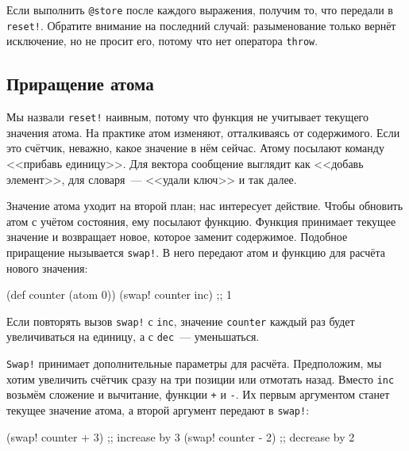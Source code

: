 Если выполнить \verb|@store| после каждого выражения, получим то, что передали в
\verb|reset!|. Обратите внимание на последний случай: разыменование только
вернёт исключение, но не просит его, потому что нет оператора \verb|throw|.

\subsection{Приращение атома}


Мы назвали \verb|reset!| наивным, потому что функция не учитывает текущего
значения атома. На практике атом изменяют, отталкиваясь от содержимого. Если это
счётчик, неважно, какое значение в нём сейчас. Атому посылают команду <<прибавь
единицу>>. Для вектора сообщение выглядит как <<добавь элемент>>, для
словаря~--- <<удали ключ>> и так далее.

Значение атома уходит на второй план; нас интересует действие. Чтобы обновить
атом с учётом состояния, ему посылают функцию. Функция принимает текущее
значение и возвращает новое, которое заменит содержимое. Подобное приращение
нызывается \verb|swap!|. В него передают атом и функцию для расчёта нового
значения:


\begin{english}
  \begin{clojure}
(def counter (atom 0))
(swap! counter inc) ;; 1
  \end{clojure}
\end{english}

\noindent
Если повторять вызов \verb|swap!| с \verb|inc|, значение \verb|counter| каждый
раз будет увеличиваться на единицу, а с \verb|dec|~--- уменьшаться.

\verb|Swap!| принимает дополнительные параметры для расчёта. Предположим, мы
хотим увеличить счётчик сразу на три позиции или отмотать назад. Вместо
\verb|inc| возьмём сложение и вычитание, функции \verb|+| и \verb|-|. Их
первым аргументом станет текущее значение атома, а второй аргумент передают в
\verb|swap!|:

\begin{english}
  \begin{clojure}
(swap! counter + 3) ;; increase by 3
(swap! counter - 2) ;; decrease by 2
  \end{clojure}
\end{english}

